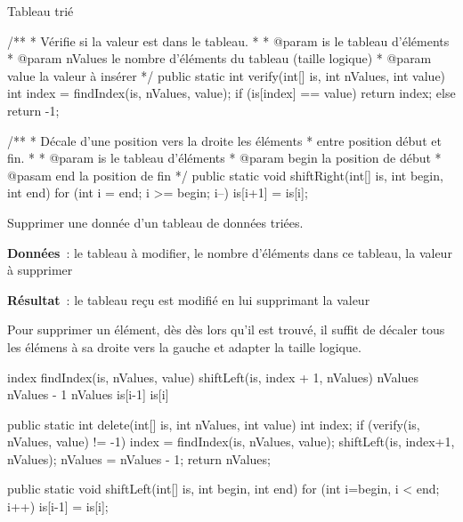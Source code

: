 \begin{Fiche}{Tableau trié}
\begin{java}
/**
 * Vérifie si la valeur est dans le tableau. 
 *
 * @param is le tableau d'éléments
 * @param nValues le nombre d'éléments du tableau (taille logique)
 * @param value la valeur à insérer
 */
public static int verify(int[] is, int nValues, int value){
	int index = findIndex(is, nValues, value);
	if (is[index] == value) {
		return index;
	} else {
		return -1;
	}
}

/**
 * Décale d'une position vers la droite les éléments 
 * entre position début et fin. 
 * 
 * @param is le tableau d'éléments
 * @param begin la position de début
 * @pasam end la position de fin
 */
public static void shiftRight(int[] is, int begin, int end){
	for (int i = end; i >= begin; i--){
		is[i+1] = is[i];
	}
}
	\end{java}



	Supprimer une donnée d'un tableau de données triées.
	
	\textbf{Données}~: le tableau à modifier, le nombre d'éléments dans ce
	tableau, la valeur à supprimer
		
	\textbf{Résultat}~: le tableau reçu est modifié en lui supprimant la valeur
		

	Pour supprimer un élément, dès dès lors qu'il est trouvé, il suffit de décaler tous les élémens à sa droite vers la gauche et adapter la taille logique. 

	\begin{pseudocode}
				\Stmt index \Gets findIndex(is, nValues, value)
				\Stmt shiftLeft(is, index + 1, nValues)
				\Let nValues \Gets nValues - 1	
			\EndIf
			\Return nValues
		\EndAlgo
		\Empty
				\Let is[i-1] \Gets is[i]
			\EndFor
		\EndAlgo
	\end{pseudocode}

	\begin{java}
public static int delete(int[] is, int nValues, int value){
	int index;
	if (verify(is, nValues, value) != -1){
		index = findIndex(is, nValues, value);
		shiftLeft(is, index+1, nValues);
		nValues = nValues - 1;
	}
	return nValues;
}

public static void shiftLeft(int[] is, int begin, int end){
	for (int i=begin, i < end; i++){
		is[i-1] = is[i];
	}
}
	\end{java}

\end{Fiche}
